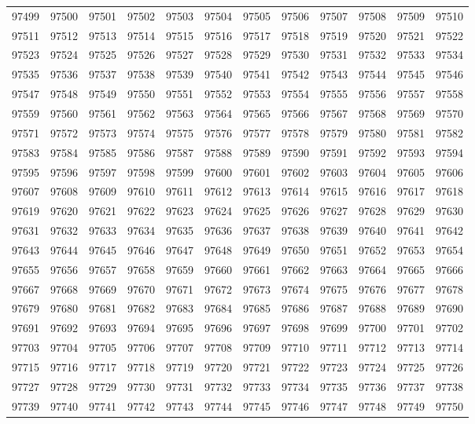\begin{center}
\begin{longtable}{llllllllllll}
97499 &97500 &97501 &97502 &97503 &97504 &97505 &97506 &97507 &97508 &97509 &97510 \\
97511 &97512 &97513 &97514 &97515 &97516 &97517 &97518 &97519 &97520 &97521 &97522 \\
97523 &97524 &97525 &97526 &97527 &97528 &97529 &97530 &97531 &97532 &97533 &97534 \\
97535 &97536 &97537 &97538 &97539 &97540 &97541 &97542 &97543 &97544 &97545 &97546 \\
97547 &97548 &97549 &97550 &97551 &97552 &97553 &97554 &97555 &97556 &97557 &97558 \\
97559 &97560 &97561 &97562 &97563 &97564 &97565 &97566 &97567 &97568 &97569 &97570 \\
97571 &97572 &97573 &97574 &97575 &97576 &97577 &97578 &97579 &97580 &97581 &97582 \\
97583 &97584 &97585 &97586 &97587 &97588 &97589 &97590 &97591 &97592 &97593 &97594 \\
97595 &97596 &97597 &97598 &97599 &97600 &97601 &97602 &97603 &97604 &97605 &97606 \\
97607 &97608 &97609 &97610 &97611 &97612 &97613 &97614 &97615 &97616 &97617 &97618 \\
97619 &97620 &97621 &97622 &97623 &97624 &97625 &97626 &97627 &97628 &97629 &97630 \\
97631 &97632 &97633 &97634 &97635 &97636 &97637 &97638 &97639 &97640 &97641 &97642 \\
97643 &97644 &97645 &97646 &97647 &97648 &97649 &97650 &97651 &97652 &97653 &97654 \\
97655 &97656 &97657 &97658 &97659 &97660 &97661 &97662 &97663 &97664 &97665 &97666 \\
97667 &97668 &97669 &97670 &97671 &97672 &97673 &97674 &97675 &97676 &97677 &97678 \\
97679 &97680 &97681 &97682 &97683 &97684 &97685 &97686 &97687 &97688 &97689 &97690 \\
97691 &97692 &97693 &97694 &97695 &97696 &97697 &97698 &97699 &97700 &97701 &97702 \\
97703 &97704 &97705 &97706 &97707 &97708 &97709 &97710 &97711 &97712 &97713 &97714 \\
97715 &97716 &97717 &97718 &97719 &97720 &97721 &97722 &97723 &97724 &97725 &97726 \\
97727 &97728 &97729 &97730 &97731 &97732 &97733 &97734 &97735 &97736 &97737 &97738 \\
97739 &97740 &97741 &97742 &97743 &97744 &97745 &97746 &97747 &97748 &97749 &97750 \\

\end{longtable}
\end{center}
